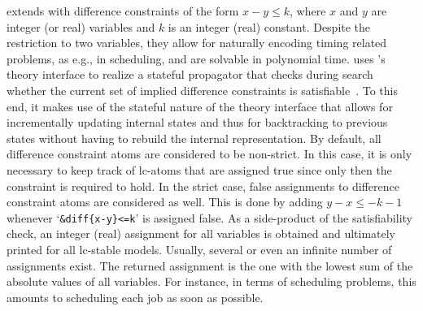 \textbf{}
extends \clingo{} with difference constraints of the form $x-y\leq k$,
where $x$ and $y$ are integer (or real) variables and $k$ is an integer (real) constant.
%
Despite the restriction to two variables, 
they allow for naturally encoding timing related problems, as e.g., in scheduling, %
and are solvable in polynomial time.
%
 uses \clingo{}'s theory interface to realize a stateful propagator
that checks during search whether the current set of implied difference constraints
is satisfiable~\cite{cotmal06a}.
%
To this end,
it makes use of the stateful nature of the theory interface
that allows 
for incrementally updating internal states
and thus for backtracking to previous states without having to rebuild the internal representation.
%
By default, all difference constraint atoms are considered to be non-strict.
In this case, it is only necessary to keep track of lc-atoms that are assigned true
since only then the constraint is required to hold.
In the strict case,
false assignments to difference constraint atoms are considered as well.
This is done by adding $y-x\leq-k-1$ 
whenever `\lstinline[mathescape]@&diff{x-y}<=k@' is assigned false.
%
As a side-product of the satisfiability check,
an integer (real) assignment for all variables is obtained
and ultimately printed for all lc-stable models.
Usually, several or even an infinite number of assignments exist. %
The returned assignment is the one with the lowest sum of the absolute values of all variables.
For instance, in terms of scheduling problems, this amounts to scheduling each job as soon as possible.

